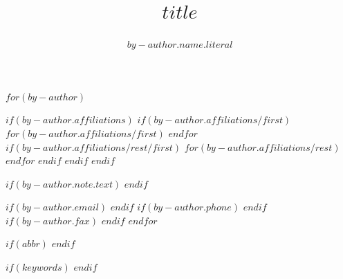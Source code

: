 $for(by-author)$
\author{$by-author.name.literal$}
$if(by-author.affiliations)$
$if(by-author.affiliations/first)$
$for(by-author.affiliations/first)$
$endfor$
$if(by-author.affiliations/rest/first)$
$for(by-author.affiliations/rest)$
$endfor$
$endif$
$endif$
$endif$

$if(by-author.note.text)$
$endif$

$if(by-author.email)$
$endif$
$if(by-author.phone)$
$endif$
$if(by-author.fax)$
$endif$
$endfor$

$if(abbr)$
$endif$

$if(keywords)$
$endif$

\title[$title-short$]{$title$}
\makeatletter
